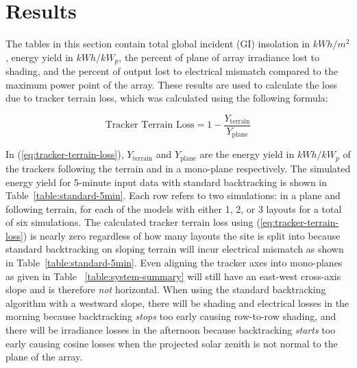 \documentclass[conference]{IEEEtran}
\begin{document}
\section{Results}

The tables in this section contain total global incident (GI) insolation in $kWh/m^2$, energy yield in $kWh/kW_p$, the percent of plane of array irradiance lost to shading, and the percent of output lost to electrical mismatch compared to the maximum power point of the array. These results are used to calculate the loss due to tracker terrain loss, which was calculated using the following formula:

\begin{equation}
\text{Tracker Terrain Loss} = 1 - \frac{Y_\text{terrain}}{Y_\text{plane}}\label{eq:tracker-terrain-loss}
\end{equation}

In (\ref{eq:tracker-terrain-loss}), $Y_\text{terrain}$ and $Y_\text{plane}$ are the energy yield in $kWh/kW_p$ of the trackers following the terrain and in a mono-plane respectively. The simulated energy yield for 5-minute input data with standard backtracking is shown in Table~\ref{table:standard-5min}. Each row refers to two simulations: in a plane and following terrain, for each of the models with either 1, 2, or 3 layouts for a total of six simulations. The calculated tracker terrain loss using (\ref{eq:tracker-terrain-loss}) is nearly zero regardless of how many layouts the site is split into because standard backtracking on sloping terrain will incur electrical mismatch as shown in Table~\ref{table:standard-5min}. Even aligning the tracker axes into mono-planes as given in Table ~\ref{table:system-summary} will still have an east-west cross-axis slope and is therefore \textit{not} horizontal. When using the standard backtracking algorithm with a westward slope, there will be shading and electrical losses in the morning because backtracking \textit{stops} too early causing row-to-row shading, and there will be irradiance losses in the afternoon because backtracking \textit{starts} too early causing cosine losses when the projected solar zenith is not normal to the plane of the array.
\end{document}
